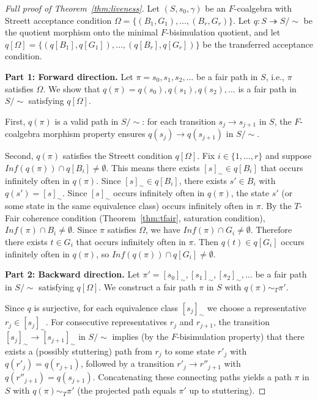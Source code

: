 \documentclass[11pt]{article}
\newcommand{\TFair}{$T$-Fair}
\begin{document}
\begin{proof}[Full proof of Theorem~\ref{thm:liveness}]
Let $(S, s_0, \gamma)$ be an $F$-coalgebra with Streett acceptance condition
$\Omega = \{(B_1, G_1), \ldots, (B_r, G_r)\}$.
Let $q : S \twoheadrightarrow S/{\sim}$ be the quotient morphism onto the
minimal $F$-bisimulation quotient, and let
$q[\Omega] = \{(q[B_1], q[G_1]), \ldots, (q[B_r], q[G_r])\}$ be the
transferred acceptance condition.

\textbf{Part 1: Forward direction.}
Let $\pi = s_0, s_1, s_2, \ldots$ be a fair path in $S$, i.e., $\pi$
satisfies $\Omega$.
We show that $q(\pi) = q(s_0), q(s_1), q(s_2), \ldots$ is a fair path
in $S/{\sim}$ satisfying $q[\Omega]$.

First, $q(\pi)$ is a valid path in $S/{\sim}$: for each transition
$s_j \to s_{j+1}$ in $S$, the $F$-coalgebra morphism property ensures
$q(s_j) \to q(s_{j+1})$ in $S/{\sim}$.

Second, $q(\pi)$ satisfies the Streett condition $q[\Omega]$.
Fix $i \in \{1, \ldots, r\}$ and suppose
$\mathit{Inf}(q(\pi)) \cap q[B_i] \neq \emptyset$.
This means there exists $[s]_\sim \in q[B_i]$ that occurs infinitely often
in $q(\pi)$.
Since $[s]_\sim \in q[B_i]$, there exists $s' \in B_i$ with $q(s') = [s]_\sim$.
Since $[s]_\sim$ occurs infinitely often in $q(\pi)$, the state $s'$ (or some
state in the same equivalence class) occurs infinitely often in $\pi$.
By the \TFair{} coherence condition (Theorem~\ref{thm:tfair}, saturation
condition), $\mathit{Inf}(\pi) \cap B_i \neq \emptyset$.
Since $\pi$ satisfies $\Omega$, we have
$\mathit{Inf}(\pi) \cap G_i \neq \emptyset$.
Therefore there exists $t \in G_i$ that occurs infinitely often in $\pi$.
Then $q(t) \in q[G_i]$ occurs infinitely often in $q(\pi)$, so
$\mathit{Inf}(q(\pi)) \cap q[G_i] \neq \emptyset$.

\textbf{Part 2: Backward direction.}
Let $\pi' = [s_0]_\sim, [s_1]_\sim, [s_2]_\sim, \ldots$ be a fair path
in $S/{\sim}$ satisfying $q[\Omega]$.
We construct a fair path $\pi$ in $S$ with $q(\pi) \sim_T \pi'$.

Since $q$ is surjective, for each equivalence class $[s_j]_\sim$ we choose
a representative $r_j \in [s_j]_\sim$.
For consecutive representatives $r_j$ and $r_{j+1}$, the transition
$[s_j]_\sim \to [s_{j+1}]_\sim$ in $S/{\sim}$ implies (by the
$F$-bisimulation property) that there exists a (possibly stuttering)
path from $r_j$ to some state $r'_j$ with $q(r'_j) = q(r_{j+1})$,
followed by a transition $r'_j \to r''_{j+1}$ with
$q(r''_{j+1}) = q(s_{j+1})$.
Concatenating these connecting paths yields a path $\pi$ in $S$ with
$q(\pi) \sim_T \pi'$ (the projected path equals $\pi'$ up to stuttering).


\end{proof}
\end{document}
